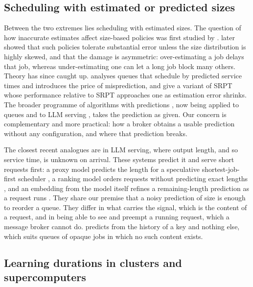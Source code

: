 \subsection{Scheduling with estimated or predicted sizes}\label{sec:rw-estimated}

Between the two extremes lies scheduling with estimated sizes. The question of how inaccurate estimates affect size-based policies was first studied by \citet{lu2004}. \citet{dellamico2014} later showed that such policies tolerate substantial error unless the size distribution is highly skewed, and that the damage is asymmetric: over-estimating a job delays that job, whereas under-estimating one can let
a long job block many others. Theory has since caught up. \citet{mitzenmacher2019} analyses queues that schedule by predicted service times and introduces the price of misprediction, and \citet{scully2022uniform} give a variant of SRPT whose performance relative to SRPT approaches one as estimation error shrinks. The broader programme of algorithms with predictions \citep{mitzenmacher2022cacm}, now being applied to queues and to LLM serving
\citep{mitzenmacher2025queueing}, takes the prediction as given. Our concern is complementary and more practical: how a broker obtains a usable prediction without any configuration, and where that prediction breaks.

The closest recent analogues are in LLM serving, where output length, and so service time, is unknown on arrival. These systems predict it and serve short requests first: a proxy model predicts the length for a speculative shortest-job-first scheduler \citep{qiu2024ssjf}, a ranking model orders requests without predicting exact lengths \citep{fu2024ltr}, and an embedding from the model itself refines a remaining-length prediction as a request runs \citep{shahout2025trail}. They share our premise that a noisy prediction of size is enough to reorder a queue. They differ in what carries the signal, which is the content of a request, and in being able to see and preempt a running request, which a message broker cannot do. \sys{} predicts from the history of a key and nothing else, which suits queues of opaque jobs in which no such content exists.

\subsection{Learning durations in clusters and supercomputers}\label{sec:rw-learning}

